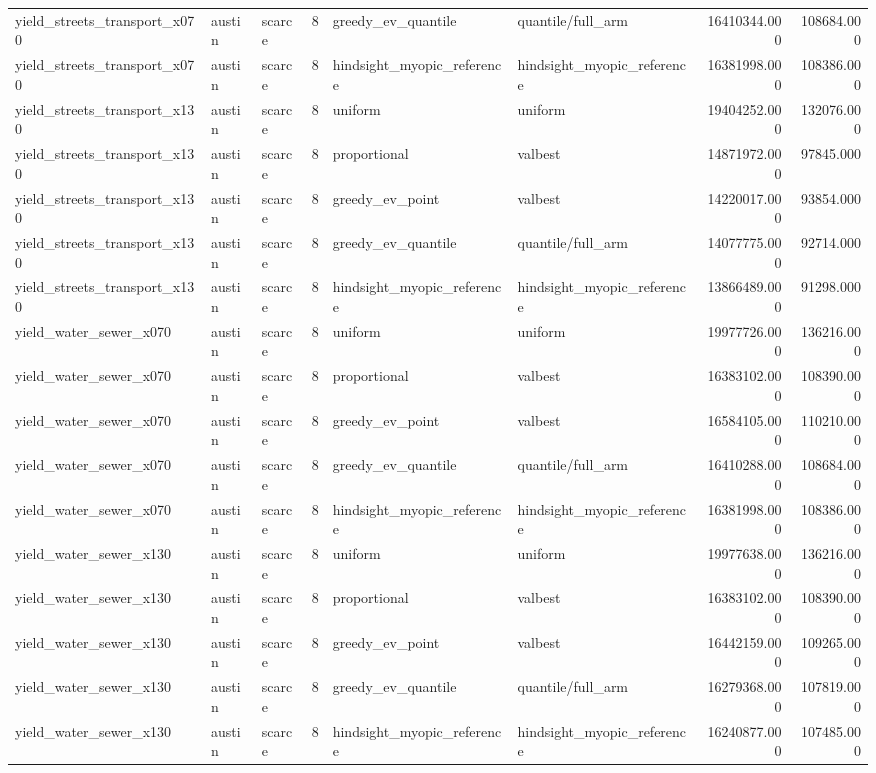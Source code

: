 \begin{tabular}{lllrllrr}
yield\_streets\_transport\_x070 & austin & scarce & 8 & greedy\_ev\_quantile & quantile/full\_arm & 16410344.000 & 108684.000 \\
yield\_streets\_transport\_x070 & austin & scarce & 8 & hindsight\_myopic\_reference & hindsight\_myopic\_reference & 16381998.000 & 108386.000 \\
yield\_streets\_transport\_x130 & austin & scarce & 8 & uniform & uniform & 19404252.000 & 132076.000 \\
yield\_streets\_transport\_x130 & austin & scarce & 8 & proportional & valbest & 14871972.000 & 97845.000 \\
yield\_streets\_transport\_x130 & austin & scarce & 8 & greedy\_ev\_point & valbest & 14220017.000 & 93854.000 \\
yield\_streets\_transport\_x130 & austin & scarce & 8 & greedy\_ev\_quantile & quantile/full\_arm & 14077775.000 & 92714.000 \\
yield\_streets\_transport\_x130 & austin & scarce & 8 & hindsight\_myopic\_reference & hindsight\_myopic\_reference & 13866489.000 & 91298.000 \\
yield\_water\_sewer\_x070 & austin & scarce & 8 & uniform & uniform & 19977726.000 & 136216.000 \\
yield\_water\_sewer\_x070 & austin & scarce & 8 & proportional & valbest & 16383102.000 & 108390.000 \\
yield\_water\_sewer\_x070 & austin & scarce & 8 & greedy\_ev\_point & valbest & 16584105.000 & 110210.000 \\
yield\_water\_sewer\_x070 & austin & scarce & 8 & greedy\_ev\_quantile & quantile/full\_arm & 16410288.000 & 108684.000 \\
yield\_water\_sewer\_x070 & austin & scarce & 8 & hindsight\_myopic\_reference & hindsight\_myopic\_reference & 16381998.000 & 108386.000 \\
yield\_water\_sewer\_x130 & austin & scarce & 8 & uniform & uniform & 19977638.000 & 136216.000 \\
yield\_water\_sewer\_x130 & austin & scarce & 8 & proportional & valbest & 16383102.000 & 108390.000 \\
yield\_water\_sewer\_x130 & austin & scarce & 8 & greedy\_ev\_point & valbest & 16442159.000 & 109265.000 \\
yield\_water\_sewer\_x130 & austin & scarce & 8 & greedy\_ev\_quantile & quantile/full\_arm & 16279368.000 & 107819.000 \\
yield\_water\_sewer\_x130 & austin & scarce & 8 & hindsight\_myopic\_reference & hindsight\_myopic\_reference & 16240877.000 & 107485.000 \\

\end{tabular}
